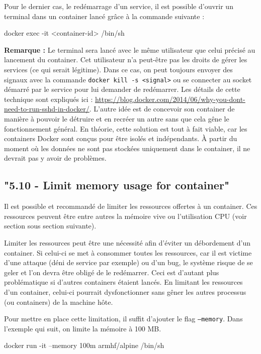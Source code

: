 \documentclass[11pt,a4paper,oneside]{report}
\newcommand{\code}[1]{\texttt{#1}}
\begin{document}
Pour le dernier cas, le redémarrage d'un service, il est possible d'ouvrir un terminal dans un container lancé grâce à la commande suivante :
\begin{bashcode}
docker exec -it <container-id> /bin/sh
\end{bashcode}

\textbf{Remarque : } Le terminal sera lancé avec le même utilisateur que celui précisé au lancement du container. Cet utilisateur n'a peut-être pas les droits de gérer les services (ce qui serait légitime). Dans ce cas, on peut toujours envoyer des signaux avec la commande \code{docker kill -s <signal>} ou se connecter au socket démarré par le service pour lui demander de redémarrer. Les détails de cette technique sont expliqués ici : \url{https://blog.docker.com/2014/06/why-you-dont-need-to-run-sshd-in-docker/}. L'autre idée est de concevoir son container de manière à pouvoir le détruire et en recréer un autre sans que cela gêne le fonctionnement général. En théorie, cette solution est tout à fait viable, car les containers Docker sont conçus pour être isolés et indépendants. À partir du moment où les données ne sont pas stockées uniquement dans le container, il ne devrait pas y avoir de problèmes.

\subsection{"5.10 - Limit memory usage for container"}
Il est possible et recommandé de limiter les ressources offertes à un container. Ces ressources peuvent être entre autres la mémoire vive ou l'utilisation CPU (voir section sous section suivante).

Limiter les ressources peut être une nécessité afin d'éviter un débordement d'un container. Si celui-ci se met à consommer toutes les ressources, car il est victime d'une attaque (déni de service par exemple) ou d'un bug, le système risque de se geler et l'on devra être obligé de le redémarrer. Ceci est d'autant plus problématique si d'autres containers étaient lancés. En limitant les ressources d'un container, celui-ci pourrait dysfonctionner sans gêner les autres processus (ou containers) de la machine hôte.

Pour mettre en place cette limitation, il suffit d'ajouter le flag \code{--memory}. Dans l'exemple qui suit, on limite la mémoire à 100 MB.

\begin{bashcode}
docker run -it --memory 100m armhf/alpine /bin/sh
\end{bashcode}
\end{document}
